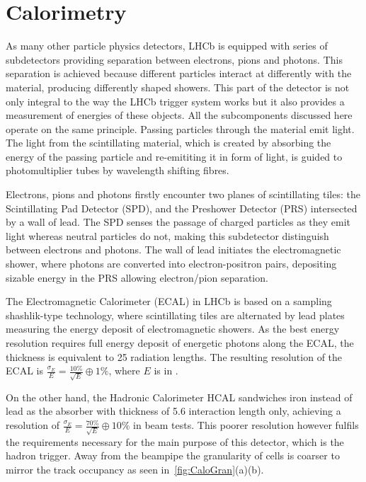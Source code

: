 \section{Calorimetry }
\label{calosys}
As many other particle physics detectors, \Gls{LHCb} is equipped with series of subdetectors providing separation between electrons, pions and photons. This separation is achieved because different particles interact at differently with the material, producing differently shaped showers. This part of the detector is not only integral to the way the \Gls{LHCb} trigger system works but it also provides a measurement of energies of these objects.
All the subcomponents discussed here operate on the same principle. Passing particles through the material emit light. The light from the scintillating material, which is created by absorbing the energy of the passing particle and re-emititing it in form of light, is guided to photomultiplier tubes by wavelength shifting fibres.

Electrons, pions and photons firstly encounter two planes of scintillating tiles: the Scintillating Pad Detector (\Gls{SPD}), and the Preshower Detector (\Gls{PRS}) intersected by a wall of lead. The \Gls{SPD} senses the passage of charged particles as they emit light whereas neutral particles do not, making this subdetector distinguish between electrons and photons. The wall of lead initiates the electromagnetic shower, where photons are converted into electron-positron pairs, depositing sizable energy in the \Gls{PRS} allowing electron/pion separation. 

The Electromagnetic Calorimeter (\Gls{ECAL}) in \gls{LHCb} is based on a sampling shashlik-type technology, where scintillating tiles are alternated by lead plates measuring the energy deposit of electromagnetic showers. As the best energy resolution requires full energy deposit of energetic photons along the \Gls{ECAL}, the thickness is equivalent to 25 radiation lengths. The resulting resolution of the \Gls{ECAL} is $\frac{\sigma_{E}}{E} = \frac{10\%}{\sqrt{E}} \oplus 1\%$, where $E$ is in \gev.

On the other hand, the Hadronic Calorimeter \Gls{HCAL} sandwiches iron instead of lead as the absorber with thickness of 5.6 interaction length only, achieving a resolution of $\frac{\sigma_{E}}{E} = \frac{70\%}{\sqrt{E}} \oplus 10\%$ in beam tests. This poorer resolution however fulfils the requirements necessary for the main purpose of this detector, which is the hadron trigger. Away from the beampipe the granularity of cells is coarser to mirror the track occupancy as seen in~\autoref{fig:CaloGran}(a)(b). 

